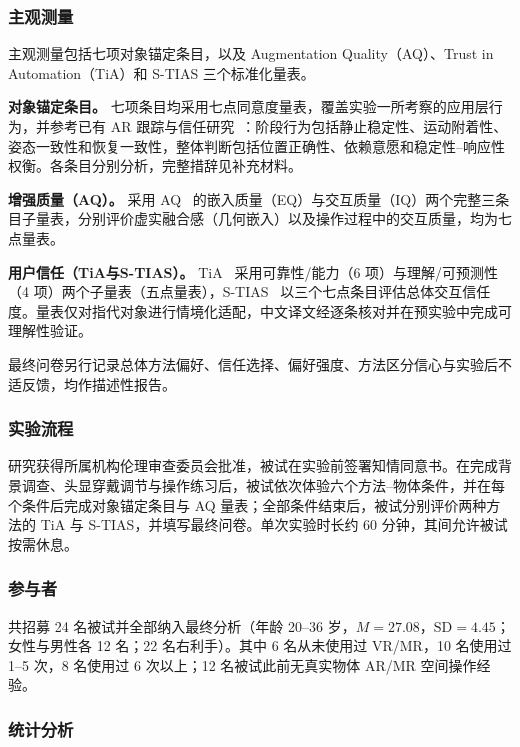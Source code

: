 \documentclass[review]{vgtc}
\begin{document}
\subsubsection{主观测量}

主观测量包括七项对象锚定条目，以及 Augmentation Quality（AQ）、Trust in Automation（TiA）和 S-TIAS 三个标准化量表。

\textbf{对象锚定条目。}
七项条目均采用七点同意度量表，覆盖实验一所考察的应用层行为，并参考已有 AR 跟踪与信任研究~\cite{trustar2024}：阶段行为包括静止稳定性、运动附着性、姿态一致性和恢复一致性，整体判断包括位置正确性、依赖意愿和稳定性--响应性权衡。各条目分别分析，完整措辞见补充材料。

\textbf{增强质量（AQ）。}
采用 AQ~\cite{aq2026} 的嵌入质量（EQ）与交互质量（IQ）两个完整三条目子量表，分别评价虚实融合感（几何嵌入）以及操作过程中的交互质量，均为七点量表。

\textbf{用户信任（TiA与S-TIAS）。}
TiA~\cite{tia2019} 采用可靠性/能力（6 项）与理解/可预测性（4 项）两个子量表（五点量表），S-TIAS~\cite{stias2025} 以三个七点条目评估总体交互信任度。量表仅对指代对象进行情境化适配，中文译文经逐条核对并在预实验中完成可理解性验证。

最终问卷另行记录总体方法偏好、信任选择、偏好强度、方法区分信心与实验后不适反馈，均作描述性报告。

\subsubsection{实验流程}

研究获得所属机构伦理审查委员会批准，被试在实验前签署知情同意书。在完成背景调查、头显穿戴调节与操作练习后，被试依次体验六个方法--物体条件，并在每个条件后完成对象锚定条目与 AQ 量表；全部条件结束后，被试分别评价两种方法的 TiA 与 S-TIAS，并填写最终问卷。单次实验时长约 60 分钟，其间允许被试按需休息。

\subsubsection{参与者}

共招募 24 名被试并全部纳入最终分析（年龄 20--36 岁，$M=27.08$，$\mathrm{SD}=4.45$；女性与男性各 12 名；22 名右利手）。其中 6 名从未使用过 VR/MR，10 名使用过 1--5 次，8 名使用过 6 次以上；12 名被试此前无真实物体 AR/MR 空间操作经验。

\subsubsection{统计分析}
\end{document}
